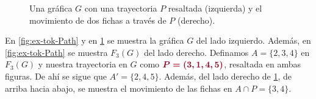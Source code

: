 \begin{figure}[ht!]
    \caption{Una gr\'afica $G$ con una trayectoria $P$ resaltada (izquierda) y
     el movimiento de dos fichas a trav\'es de $P$ (derecho).}
    \label{fig:ex-tok-aux}
\end{figure}
    
En \cref{fig:ex-tok-Path} y en \cref{fig:ex-tok-aux} se muestra la gr\'afica $G$
del lado izquierdo. Adem\'as, en \cref{fig:ex-tok-Path} se muestra $F_3(G)$ del
lado derecho. Definamos $A=\{2,3,4\}$ en $F_3(G)$ y nuestra trayectoria en $G$
como ${\color{vino}\boldsymbol {P= (3,1,4,5)}}$, resaltada en ambas figuras. De
ah\'i se sigue que $A'=\{2,4,5\}$. Adem\'as, del lado derecho de
\cref{fig:ex-tok-aux}, de arriba hacia abajo, se muestra el movimiento de las
fichas en $A \cap P =\{3,4\}$.

